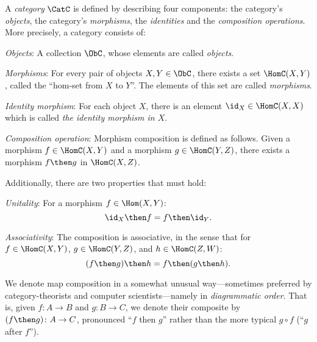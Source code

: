 \begin{shaded}
\begin{definition}[Category] \label{def:categorymain}
A \emph{category} $\CatC$ is defined by describing four components: the
category's \emph{objects}, the category's \emph{morphisms},
the \emph{identities} and the \emph{composition operations}. More precisely,
a category consists of:
\begin{compactenum}
\item \emph{Objects}: A collection $\ObC$, whose elements are called \emph{objects}.
\item \emph{Morphisms}: For every pair of objects $X, Y\in\ObC$, there exists a set $\HomC(X, Y)$, called the ``hom-set from
$X$ to $Y$''. The elements of this set are called \emph{morphisms}.
\item \emph{Identity morphism}:  For each object $X$, there is
an element $\id_X \in \HomC(X,X) $ which is called \emph{the identity
morphism in $X$}.
\item \emph{Composition operation}: Morphism composition is defined as follows. Given a morphism $f \in  \HomC(X,Y) $ and a morphism $g \in \HomC(Y, Z)$, there exists a morphism $f\then g$ in $\HomC(X, Z)$.

Additionally, there are two properties that must hold:

\begin{compactenum}
    \item \emph{Unitality}: For a morphism $f\in\Hom(X,Y)$: 
    \begin{equation}
        \id_X \then f=f \then \id_Y.
    \end{equation}
    \item \emph{Associativity}: The composition is associative, in the sense that for $f\in \HomC(X,Y)$, $g\in \HomC(Y,Z)$, and $h\in \HomC(Z,W)$:
    \begin{equation}
        (f\then g)\then h= f \then (g \then h).
    \end{equation}
\end{compactenum}

\end{compactenum}
\end{definition}
\end{shaded}

\begin{remark}
We denote map composition in a somewhat unusual way---sometimes preferred by category-theorists and computer scientists---namely in \emph{diagrammatic order}. That is, given $f\colon A\to B$ and $g\colon B\to C$, we denote their composite by $(f\then g)\colon A\to C$, pronounced ``$f$ then $g$'' rather than the more typical $g\circ f$ (``$g$ after $f$'').
\end{remark}

